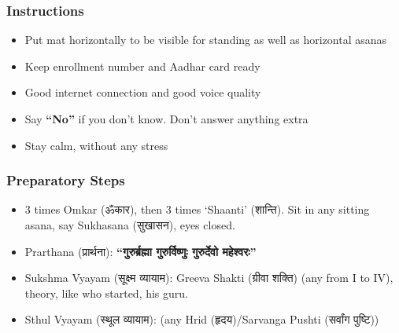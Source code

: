 \begin{frame}[fragile]\frametitle{Instructions}
    \begin{itemize}
        \item Put mat horizontally to be visible for standing as well as horizontal asanas
        \item Keep enrollment number and Aadhar card ready
        \item Good internet connection and good voice quality
        \item Say \textbf{“No”} if you don’t know. Don’t answer anything extra
        \item Stay calm, without any stress
    \end{itemize}
\end{frame}

\begin{frame}[fragile]\frametitle{Preparatory Steps}
    \begin{itemize}
        \item 3 times Omkar (ॐकार), then 3 times ‘Shaanti’ (शान्ति). Sit in any sitting asana, say Sukhasana (सुखासन), eyes closed.
        \item Prarthana (प्रार्थना): \textbf{“गुरुर्ब्रह्मा गुरुर्विष्णुः गुरुर्देवो महेश्वरः”}
        \item Sukshma Vyayam (सूक्ष्म व्यायाम): Greeva Shakti (ग्रीवा शक्ति) (any from I to IV), theory, like who started, his guru.
        \item Sthul Vyayam (स्थूल व्यायाम): (any Hrid (हृदय)/Sarvanga Pushti (सर्वांग पुष्टि))
    \end{itemize}
\end{frame}


